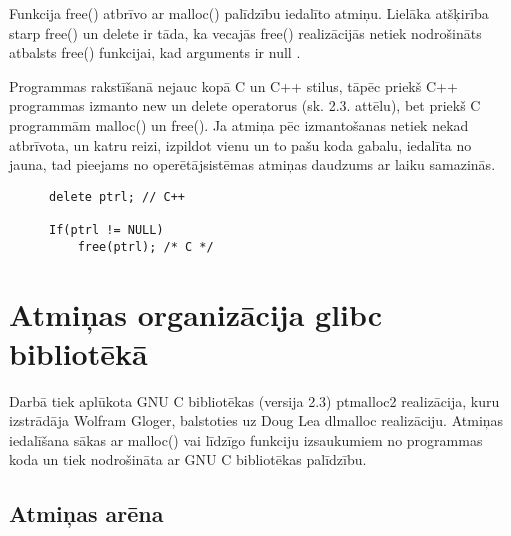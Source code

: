 Funkcija free() atbrīvo ar malloc() palīdzību iedalīto atmiņu.
Lielāka atšķirība starp free() un delete ir tāda, ka vecajās free() realizācijās netiek nodrošināts atbalsts free() funkcijai, kad arguments ir null \cite{POCF}. 

Programmas rakstīšanā nejauc kopā C un C++ stilus, tāpēc priekš C++ programmas izmanto 
new un delete operatorus (sk. 2.3. attēlu), bet priekš C programmām malloc() un free().
Ja atmiņa pēc izmantošanas netiek nekad atbrīvota, un katru reizi, izpildot vienu un to pašu koda gabalu, iedalīta no jauna, tad pieejams no operētājsistēmas atmiņas daudzums ar laiku samazinās.

\begin{figure}[h]
\begin{lstlisting}
delete ptrl; // C++

If(ptrl != NULL)
	free(ptrl); /* C */
\end{lstlisting}
\caption{\textbf{\fontsize{11}{12}\selectfont {Dinamiskās atmiņas atbrīvošana C un C++}}}
\end{figure}




\section{Atmiņas organizācija glibc bibliotēkā}
Darbā tiek aplūkota GNU C bibliotēkas (versija 2.3) ptmalloc2 realizācija, kuru izstrādāja Wolfram Gloger, balstoties uz Doug Lea dlmalloc realizāciju. 
Atmiņas iedalīšana sākas ar malloc() vai līdzīgo funkciju izsaukumiem no programmas koda un tiek nodrošināta ar GNU C bibliotēkas palīdzību. 


\subsection{Atmiņas arēna}

